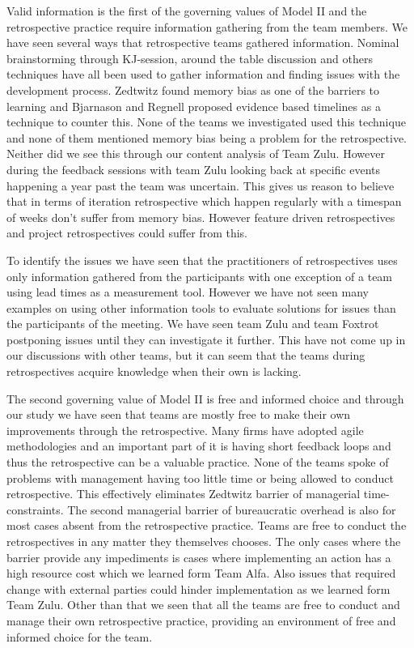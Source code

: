 Valid information is the first of the governing values of Model II and the retrospective practice require information gathering from the team members. We have seen several ways that retrospective teams gathered information. Nominal brainstorming through KJ-session, around the table discussion and others techniques have all been used to gather information and finding issues with the development process. Zedtwitz\cite{Zedtwitz2002} found memory bias as one of the barriers to learning and Bjarnason and Regnell\cite{Bjarnason2012} proposed evidence based timelines as a technique to counter this. None of the teams we investigated used this technique and none of them mentioned memory bias being a problem for the retrospective. Neither did we see this through our content analysis of Team Zulu. However during the feedback sessions with team Zulu looking back at specific events happening a year past the team was uncertain. This gives us reason to believe that in terms of iteration retrospective which happen regularly with a timespan of weeks don't suffer from memory bias. However feature driven retrospectives and project retrospectives could suffer from this. 

To identify the issues we have seen that the practitioners of retrospectives uses only information gathered from the participants with one exception of a team using lead times as a measurement tool. However we have not seen many examples on using other information tools to evaluate solutions for issues than the participants of the meeting. We have seen team Zulu and team Foxtrot postponing issues until they can investigate it further. This have not come up in our discussions with other teams, but it can seem that the teams during retrospectives acquire knowledge when their own is lacking.

The second governing value of Model II is free and informed choice and through our study we have seen that teams are mostly free to make their own improvements through the retrospective. Many firms have adopted agile methodologies and an important part of it is having short feedback loops and thus the retrospective can be a valuable practice. None of the teams spoke of problems with management having too little time or being allowed to conduct retrospective. This effectively eliminates Zedtwitz\cite{Zedtwitz2002} barrier of managerial time-constraints. The second managerial barrier of bureaucratic overhead is also for most cases absent from the retrospective practice. Teams are free to conduct the retrospectives in any matter they themselves chooses. The only cases where the barrier provide any impediments is cases where implementing an action has a high resource cost which we learned form Team Alfa. Also issues that required change with external parties could hinder implementation as we learned form Team Zulu. Other than that we seen that all the teams are free to conduct and manage their own retrospective practice, providing an environment of free and informed choice for the team. 


